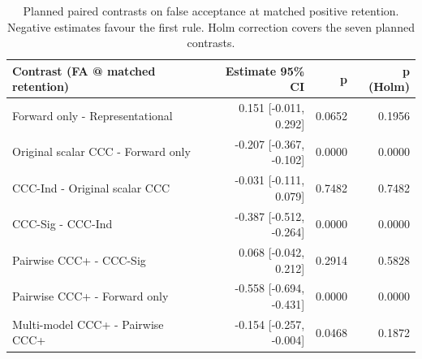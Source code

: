 \begin{table}[t]
\centering
\small
\begin{tabular}{lrrr}
\toprule
Contrast (FA @ matched retention) & Estimate 95\% CI & p & p (Holm) \\
\midrule
Forward only - Representational & 0.151 [-0.011, 0.292] & 0.0652 & 0.1956 \\
Original scalar CCC - Forward only & -0.207 [-0.367, -0.102] & 0.0000 & 0.0000 \\
CCC-Ind - Original scalar CCC & -0.031 [-0.111, 0.079] & 0.7482 & 0.7482 \\
CCC-Sig - CCC-Ind & -0.387 [-0.512, -0.264] & 0.0000 & 0.0000 \\
Pairwise CCC+ - CCC-Sig & 0.068 [-0.042, 0.212] & 0.2914 & 0.5828 \\
Pairwise CCC+ - Forward only & -0.558 [-0.694, -0.431] & 0.0000 & 0.0000 \\
Multi-model CCC+ - Pairwise CCC+ & -0.154 [-0.257, -0.004] & 0.0468 & 0.1872 \\
\bottomrule
\end{tabular}
\caption{Planned paired contrasts on false acceptance at matched positive retention. Negative estimates favour the first rule. Holm correction covers the seven planned contrasts.}
\label{tab:table_5_1b_contrasts}
\end{table}